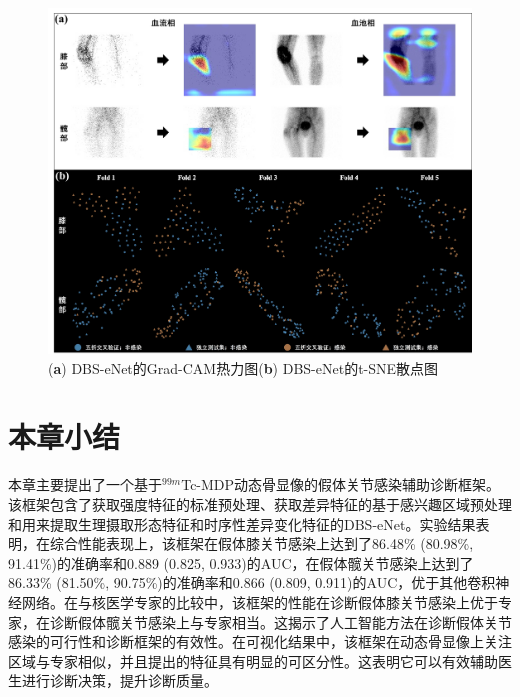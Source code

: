 \begin{figure}[htbp]
  \centering
  \includegraphics[width=\textwidth]{figures/chap03_Grad-CAM_t-SNE.jpg}
  \caption{(\textbf{a}) DBS-eNet的Grad-CAM热力图\quad(\textbf{b}) DBS-eNet的t-SNE散点图}
  \label{fig:chap03_Grad-CAM_t-SNE}
\end{figure}

\section{本章小结}

本章主要提出了一个基于\(^{99m}\)Tc-MDP动态骨显像的假体关节感染辅助诊断框架。该框架包含了获取强度特征的标准预处理、获取差异特征的基于感兴趣区域预处理和用来提取生理摄取形态特征和时序性差异变化特征的DBS-eNet。实验结果表明，在综合性能表现上，该框架在假体膝关节感染上达到了86.48\% (80.98\%, 91.41\%)的准确率和0.889 (0.825, 0.933)的AUC，在假体髋关节感染上达到了86.33\% (81.50\%, 90.75\%)的准确率和0.866 (0.809, 0.911)的AUC，优于其他卷积神经网络。在与核医学专家的比较中，该框架的性能在诊断假体膝关节感染上优于专家，在诊断假体髋关节感染上与专家相当。这揭示了人工智能方法在诊断假体关节感染的可行性和诊断框架的有效性。在可视化结果中，该框架在动态骨显像上关注区域与专家相似，并且提出的特征具有明显的可区分性。这表明它可以有效辅助医生进行诊断决策，提升诊断质量。
